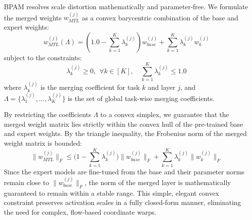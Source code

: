 BPAM resolves scale distortion mathematically and parameter-free. We formulate the merged weights $w_{MTL}^{(j)}$ as a convex barycentric combination of the base and expert weights:
\begin{equation}
    w_{MTL}^{(j)}(\Lambda) = \left(1.0 - \sum_{k=1}^K \lambda_k^{(j)}\right) w_{base}^{(j)} + \sum_{k=1}^K \lambda_k^{(j)} w_k^{(j)}
\end{equation}
subject to the constraints:
\begin{equation}
    \lambda_k^{(j)} \geq 0, \ \ \forall k \in [K], \quad \sum_{k=1}^K \lambda_k^{(j)} \leq 1.0
\end{equation}
where $\lambda_k^{(j)}$ is the merging coefficient for task $k$ and layer $j$, and $\Lambda = \{\lambda_1^{(j)}, \dots, \lambda_K^{(j)}\}$ is the set of global task-wise merging coefficients.

By restricting the coefficients $\Lambda$ to a convex simplex, we guarantee that the merged weight matrix lies strictly within the convex hull of the pre-trained base and expert weights. By the triangle inequality, the Frobenius norm of the merged weight matrix is bounded:
\begin{equation}
    \|w_{MTL}^{(j)}\|_F \leq \Big(1 - \sum_{k=1}^K \lambda_k^{(j)}\Big) \|w_{base}^{(j)}\|_F + \sum_{k=1}^K \lambda_k^{(j)} \|w_k^{(j)}\|_F
\end{equation}
Since the expert models are fine-tuned from the base and their parameter norms remain close to $\|w_{base}^{(j)}\|_F$, the norm of the merged layer is mathematically guaranteed to remain within a stable range. This simple, elegant convex constraint preserves activation scales in a fully closed-form manner, eliminating the need for complex, flow-based coordinate warps.

